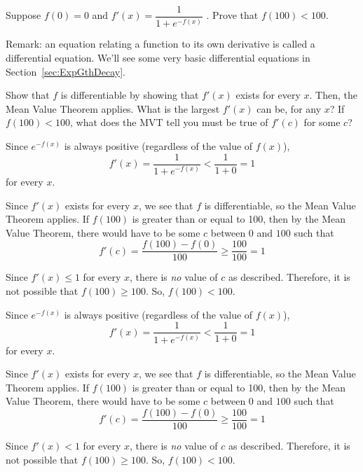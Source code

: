 \begin{question}[2009H]
 Suppose $f(0) = 0$ and
$f'(x) = \dfrac{1}{1 + e^{-f(x)}}$ . Prove that $f(100) < 100$.
\medskip

Remark: an equation  relating a function to its own derivative is called a differential equation. We'll see some very basic differential equations in Section~\ref*{sec:ExpGthDecay}.
\end{question}
\begin{hint}
Show that $f$ is differentiable by showing that $f'(x)$ exists for every $x$. Then, the Mean Value Theorem applies. What is the largest $f'(x)$ can be, for any $x$? If $f(100)<100$, what does the MVT tell you must be true of $f'(c)$ for some $c$?
\end{hint}
\begin{answer}
Since $e^{-f(x)}$ is always positive (regardless of the value of $f(x)$),
\[f'(x)=\dfrac{1}{1+e^{-f(x)}}<\dfrac{1}{1+0}=1\] for every $x$.

Since  $f'(x)$ exists for every $x$, we see that $f$ is differentiable, so the Mean Value Theorem applies. If $f(100)$ is greater than or equal to 100, then by the Mean Value Theorem,
 there would have
to be some $c$ between $0$ and $100$ such that
$$
f'(c) = \frac{f(100)-f(0)}{100}\geq\frac{100}{100}= 1
$$

Since $f'(x) \leq 1$ for every $x$, there is \emph{no} value of $c$ as described.
Therefore, it is not possible that  $f(100) \geq 100$. So, $f(100)<100$.
\end{answer}
\begin{solution}
Since $e^{-f(x)}$ is always positive (regardless of the value of $f(x)$),
\[f'(x)=\dfrac{1}{1+e^{-f(x)}}<\dfrac{1}{1+0}=1\] for every $x$.

Since  $f'(x)$ exists for every $x$, we see that $f$ is differentiable, so the Mean Value Theorem applies. If $f(100)$ is greater than or equal to 100, then by the Mean Value Theorem,
 there would have
to be some $c$ between $0$ and $100$ such that
$$
f'(c) = \frac{f(100)-f(0)}{100}\geq\frac{100}{100}= 1
$$

Since $f'(x) < 1$ for every $x$, there is \emph{no} value of $c$ as described.
Therefore, it is not possible that  $f(100) \geq 100$. So, $f(100)<100$.
\end{solution}


